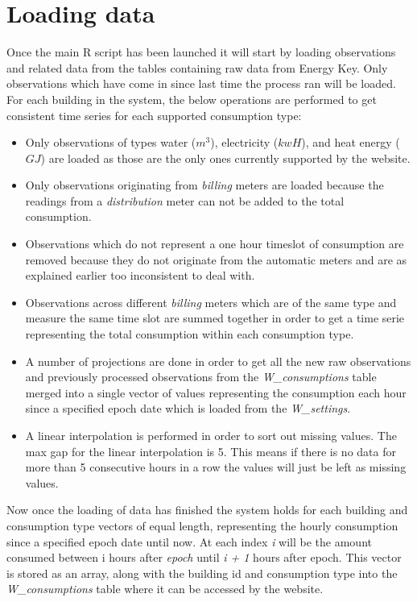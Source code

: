 \section*{Loading data}
Once the main R script has been launched it will start by loading observations and related data from the tables containing raw data from Energy Key. Only observations which have come in since last time the process ran will be loaded. For each building in the system, the below operations are performed to get consistent time series for each supported consumption type:
\begin{itemize}
\item Only observations of types water ($m^3$), electricity ($kwH$), and heat energy ($GJ$) are loaded as those are the only ones currently supported by the website.
\item Only observations originating from \emph{billing} meters are loaded because the readings from a \emph{distribution} meter can not be added to the total consumption.
\item Observations which do not represent a one hour timeslot of consumption are removed because they do not originate from the automatic meters and are as explained earlier too inconsistent to deal with.
\item Observations across different \emph{billing} meters which are of the same type and measure the same time slot are summed together in order to get a time serie representing the total consumption within each consumption type.
\item A number of projections are done in order to get all the new raw observations and previously processed observations from the \emph{W\_consumptions} table merged into a single vector of values representing the consumption each hour since a specified epoch date which is loaded from the \emph{W\_settings}.
\item A linear interpolation is performed in order to sort out missing values. The max gap for the linear interpolation is 5. This means if there is no data for more than 5 consecutive hours in a row the values will just be left as missing values.
\end{itemize}
Now once the loading of data has finished the system holds for each building and consumption type vectors of equal length, representing the hourly consumption since a specified epoch date until now. At each index \emph{i} will be the amount consumed between i hours after \emph{epoch} until \emph{i + 1} hours after epoch. This vector is stored as an array, along with the building id and consumption type into the \emph{W\_consumptions} table where it can be accessed by the website.
